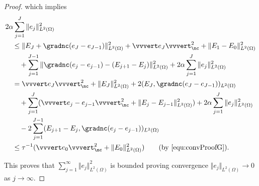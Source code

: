 \begin{proof}
  \noindent which implies
  \begin{align*}
    &2\alpha\sum_{j=1}^J\Vert e_j\Vert^2_{L^2(\Omega)} \\
    &\quad\leq
    \Vert E_J + \gradnc(e_J-e_{J-1}) \Vert_{L^2(\Omega)}^2 
    + \vvvert e_J \vvvert^2_\nc 
    + \Vert E_1 - E_0 \Vert^2_{L^2(\Omega)} \\
    &\quad\quad 
    + \sum_{j=1}^{J-1}  
      \Vert \gradnc(e_j-e_{j-1}) - (E_{j+1} - E_j ) \Vert^2_{L^2(\Omega)} 
    + 2\alpha\sum_{j=1}^J\Vert e_j\Vert^2_{L^2(\Omega)}\\
    &\quad = 
    \vvvert e_J \vvvert^2_\nc + \Vert E_J \Vert_{L^2(\Omega)}^2 
    + 2(E_{J},\gradnc(e_J-e_{J-1}))_{L^2(\Omega)} \\
    &\quad\quad 
    + \sum_{j=1}^J ( \vvvert e_j-e_{j-1} \vvvert^2_\nc
    + \Vert E_j - E_{j-1} \Vert^2_{L^2(\Omega)} )
    + 2\alpha\sum_{j=1}^J\Vert e_j\Vert^2_{L^2(\Omega)}\\
    &\quad\quad 
    - 2\sum_{j=1}^{J-1}(E_{j+1}-E_j,\gradnc(e_j-e_{j-1}))_{L^2(\Omega)}\\
    &\quad\leq
    \tau^{-1}(\vvvert e_0\vvvert^2_\nc + \Vert E_0\Vert^2_{L^2(\Omega)})
    \tag{by \eqref{equ:convProofG}}.
  \end{align*}

  \noindent This proves that 
  $\sum_{j=1}^\infty \Vert e_j\Vert _{L^2(\Omega)}^2$ is bounded
  proving convergence $\Vert e_j\Vert_{L^2(\Omega)}\rightarrow 0$
  as $j\rightarrow \infty$.
\end{proof}
